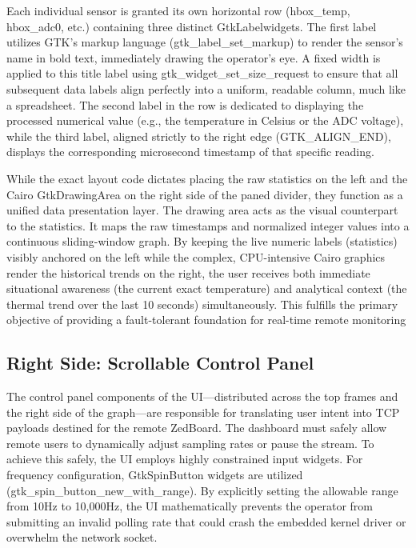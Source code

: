 Each individual sensor is granted its own horizontal row (hbox\_temp, hbox\_adc0, etc.) containing three distinct GtkLabelwidgets. The first label utilizes GTK's markup language (gtk\_label\_set\_markup) to render the sensor's name in bold text, immediately drawing the operator's eye. A fixed width is applied to this title label using gtk\_widget\_set\_size\_request to ensure that all subsequent data labels align perfectly into a uniform, readable column, much like a spreadsheet. The second label in the row is dedicated to displaying the processed numerical value (e.g., the temperature in Celsius or the ADC voltage), while the third label, aligned strictly to the right edge (GTK\_ALIGN\_END), displays the corresponding microsecond timestamp of that specific reading.

While the exact layout code dictates placing the raw statistics on the left and the Cairo GtkDrawingArea on the right side of the paned divider, they function as a unified data presentation layer. The drawing area acts as the visual counterpart to the statistics. It maps the raw timestamps and normalized integer values into a continuous sliding-window graph. By keeping the live numeric labels (statistics) visibly anchored on the left while the complex, CPU-intensive Cairo graphics render the historical trends on the right, the user receives both immediate situational awareness (the current exact temperature) and analytical context (the thermal trend over the last 10 seconds) simultaneously. This fulfills the primary objective of providing a fault-tolerant foundation for real-time remote monitoring


\subsection{Right Side: Scrollable Control Panel}
The control panel components of the UI—distributed across the top frames and the right side of the graph—are responsible for translating user intent into TCP payloads destined for the remote ZedBoard. The dashboard must safely allow remote users to dynamically adjust sampling rates or pause the stream. To achieve this safely, the UI employs highly constrained input widgets. For frequency configuration, GtkSpinButton widgets are utilized (gtk\_spin\_button\_new\_with\_range). By explicitly setting the allowable range from 10Hz to 10,000Hz, the UI mathematically prevents the operator from submitting an invalid polling rate that could crash the embedded kernel driver or overwhelm the network socket.

